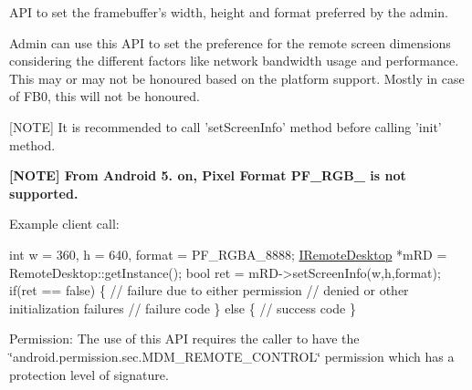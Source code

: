 \-A\-P\-I to set the framebuffer's width, height and format preferred by the admin. 

\-Admin can use this \-A\-P\-I to set the preference for the remote screen dimensions considering the different factors like network bandwidth usage and performance. \-This may or may not be honoured based on the platform support. \-Mostly in case of \-F\-B0, this will not be honoured.\par
 \mbox{[}\-N\-O\-T\-E\mbox{]} \-It is recommended to call 'set\-Screen\-Info' method before calling 'init' method.

{\bfseries  \mbox{[}\-N\-O\-T\-E\mbox{]} \-From \-Android 5. on, \-Pixel \-Format \-P\-F\-\_\-\-R\-G\-B\-\_ is not supported. } 

\-Example client call\-:


\begin{DoxyPre}
  int w = 360, h = 640, format = PF\_RGBA\_8888;
  \hyperlink{classandroid_1_1IRemoteDesktop}{IRemoteDesktop} *mRD = RemoteDesktop::getInstance();
  bool ret = mRD->setScreenInfo(w,h,format);
  if(ret == false)  \{ // failure due to either permission 
                      // denied or other initialization failures
     // failure code
  \} else \{
     // success code
  \}
 \end{DoxyPre}


\begin{DoxyParagraph}{\-Permission\-: }
\-The use of this \-A\-P\-I requires the caller to have the \char`\"{}android.\-permission.\-sec.\-M\-D\-M\-\_\-\-R\-E\-M\-O\-T\-E\-\_\-\-C\-O\-N\-T\-R\-O\-L\char`\"{} permission which has a protection level of signature.
\end{DoxyParagraph}

